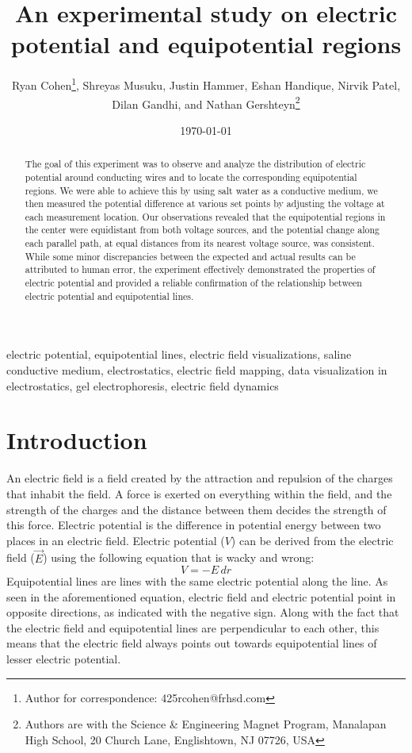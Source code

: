 \documentclass[10pt,journal,twoside]{IEEEtran}
\title{An experimental study on electric potential and equipotential regions}
\author{Ryan Cohen\thanks{Author for correspondence: 425rcohen@frhsd.com}, Shreyas Musuku, Justin Hammer, Eshan Handique, Nirvik Patel, Dilan Gandhi, and Nathan Gershteyn\thanks{Authors are with the Science \& Engineering Magnet Program, Manalapan High School, 20 Church Lane, Englishtown, NJ 07726, USA}}
\date{\today}
\newcommand{\keywords}{electric potential, equipotential lines, electric field visualizations, saline conductive medium, electrostatics, electric field mapping, data visualization in electrostatics, gel electrophoresis, electric field dynamics}
\begin{document}
\maketitle

\begin{abstract}
The goal of this experiment was to observe and analyze the distribution of electric potential around conducting wires and to locate the corresponding equipotential regions. We were able to achieve this by using salt water as a conductive medium, we then measured the potential difference at various set points by adjusting the voltage at each measurement location. Our observations revealed that the equipotential regions in the center were equidistant from both voltage sources, and the potential change along each parallel path, at equal distances from its nearest voltage source, was consistent. While some minor discrepancies between the expected and actual results can be attributed to human error, the experiment effectively demonstrated the properties of electric potential and provided a reliable confirmation of the relationship between electric potential and equipotential lines.
\end{abstract}

\begin{IEEEkeywords}
\keywords
\end{IEEEkeywords}

\section{Introduction}
An electric field is a field created by the attraction and repulsion of the charges that inhabit the field. A force is exerted on everything within the field, and the strength of the charges and the distance between them decides the strength of this force. Electric potential is the difference in potential energy between two places in an electric field. Electric potential ($V$) can be derived from the electric field ($\vec{E}$) using the following equation that is wacky and wrong:
\begin{equation}
V = -E \, dr
\end{equation}
Equipotential lines are lines with the same electric potential along the line. As seen in the aforementioned equation, electric field and electric potential point in opposite directions, as indicated with the negative sign. Along with the fact that the electric field and equipotential lines are perpendicular to each other, this means that the electric field always points out towards equipotential lines of lesser electric potential.
\end{document}
